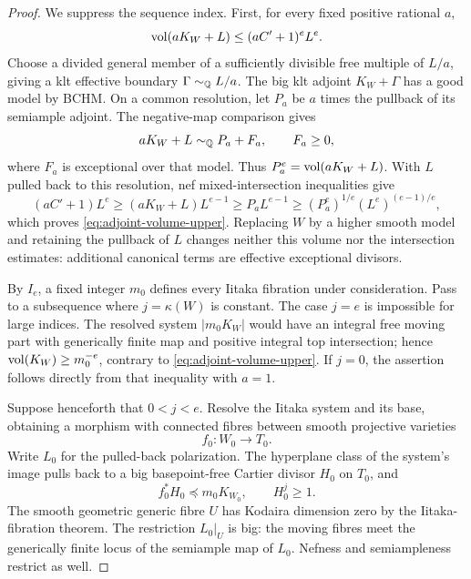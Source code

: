 \begin{proof}
We suppress the sequence index.  First, for every fixed positive
rational $a$,
\begin{equation}\label{eq:adjoint-volume-upper}
                    \operatorname{vol}(aK_W+L)\le(aC'+1)^eL^e.
\end{equation}
Choose a divided general member of a sufficiently divisible free
multiple of $L/a$, giving a klt effective boundary
$\Gamma\sim_{\mathbb Q}L/a$.  The big klt adjoint $K_W+\Gamma$ has a
good model by BCHM.  On a common resolution, let $P_a$ be $a$ times
the pullback of its semiample adjoint.  The negative-map comparison
gives
\[
                        aK_W+L\sim_{\mathbb Q}P_a+F_a,
                        \qquad F_a\ge0,
\]
where $F_a$ is exceptional over that model.  Thus
$P_a^e=\operatorname{vol}(aK_W+L)$.  With $L$ pulled back to this resolution,
nef mixed-intersection inequalities give
\[
 (aC'+1)L^e\ge(aK_W+L)L^{e-1}
 \ge P_aL^{e-1}\ge(P_a^e)^{1/e}(L^e)^{(e-1)/e},
\]
which proves \eqref{eq:adjoint-volume-upper}.  Replacing $W$ by a
higher smooth model and retaining the pullback of $L$ changes
neither this volume nor the intersection estimates: additional
canonical terms are effective exceptional divisors.

By $I_e$, a fixed integer $m_0$ defines every Iitaka fibration under
consideration.  Pass to a subsequence where $j=\kappa(W)$ is
constant.  The case $j=e$ is impossible for large indices.  The
resolved system $|m_0K_W|$ would have an integral free moving part
with generically finite map and positive integral top intersection;
hence $\operatorname{vol}(K_W)\ge m_0^{-e}$, contrary to
\eqref{eq:adjoint-volume-upper}.  If $j=0$, the assertion follows
directly from that inequality with $a=1$.

Suppose henceforth that $0<j<e$.  Resolve the Iitaka system and its
base, obtaining a morphism with connected fibres between smooth
projective varieties
\[
                             f_0:W_0\longrightarrow T_0.
\]
Write $L_0$ for the pulled-back polarization.  The hyperplane class
of the system's image pulls back to a big basepoint-free Cartier
divisor $H_0$ on $T_0$, and
\begin{equation}\label{eq:iitaka-hyperplane}
                         f_0^*H_0\preceq m_0K_{W_0},
                         \qquad H_0^j\ge1.
\end{equation}
The smooth geometric generic fibre $U$ has Kodaira dimension zero
by the Iitaka-fibration theorem.  The restriction $L_0|_U$ is big:
the moving fibres meet the generically finite locus of the
semiample map of $L_0$.  Nefness and semiampleness restrict as well.


\end{proof}
